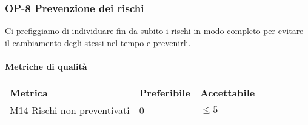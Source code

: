 		\subsubsection{OP-8 Prevenzione dei rischi} 
			Ci prefiggiamo di individuare fin da subito i rischi in modo completo per evitare il cambiamento degli stessi nel tempo e prevenirli.
			\paragraph{Metriche di qualità} \mbox{} 
			\begin{longtable} {
					>{}p{80mm} 
					>{}p{25mm}
					>{}p{25mm}
				}
				\rowcolor{gray!50}
				\textbf{Metrica} & \textbf{Preferibile} & \textbf{Accettabile} \TBstrut \TBstrut \\
				M14 Rischi non preventivati & 0 & $ \le 5$ \TBstrut \\ [2mm]
			\end{longtable}
			

